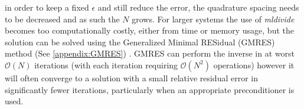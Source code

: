 in order to keep a fixed $\epsilon$ and still reduce the error, the quadrature spacing needs to be decreased and as such the $N$ grows. For larger systems the use of \textit{mldivide} becomes too computationally costly, either from time or memory usage, but the solution can be solved using the Generalized Minimal RESidual (GMRES) method (See \cref{appendix:GMRES}) \cite{Saad1986GMRES:Systems,Elman2005FiniteDynamics}. GMRES can perform the inverse in at worst $\mathcal{O}(N)$ iterations (with each iteration requiring $\mathcal{O}(N^2)$ operations) however it will often converge to a solution with a small relative residual error in significantly fewer iterations, particularly when an appropriate preconditioner is used. 